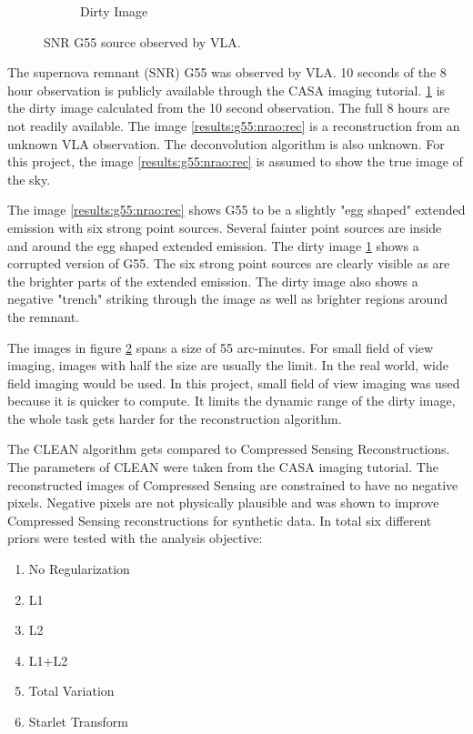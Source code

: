 \begin{figure}[h]
\begin{subfigure}[b]{0.45\linewidth}
		\caption{Dirty Image}
		\label{results:g55:nrao:dirty}
	\end{subfigure}
	\caption{SNR G55 source observed by VLA.}
	\label{results:g55:nrao}
\end{figure}

The supernova remnant (SNR) G55 was observed by VLA. 10 seconds of the 8 hour observation is publicly available through the CASA imaging tutorial\cite{casaImagingGuide}. \ref{results:g55:nrao:dirty} is the dirty image calculated from the 10 second observation. The full 8 hours are not readily available. The image \ref{results:g55:nrao:rec} is a reconstruction from an unknown VLA observation. The deconvolution algorithm is also unknown. For this project, the image \ref{results:g55:nrao:rec} is assumed to show the true image of the sky.

The image \ref{results:g55:nrao:rec} shows G55 to be a slightly "egg shaped" extended emission with six strong point sources. Several fainter point sources are inside and around the egg shaped extended emission. The dirty image \ref{results:g55:nrao:dirty} shows a corrupted version of G55. The six strong point sources are clearly visible as are the brighter parts of the extended emission. The dirty image also shows a negative "trench" striking through the image as well as brighter regions around the remnant. 

The images in figure \ref{results:g55:nrao} spans a size of 55 arc-minutes. For small field of view imaging, images with half the size are usually the limit. In the real world, wide field imaging would be used. In this project, small field of view imaging was used because it is quicker to compute. It limits the dynamic range of the dirty image, the whole task gets harder for the reconstruction algorithm.

The CLEAN algorithm gets compared to Compressed Sensing Reconstructions. The parameters of CLEAN were taken from the CASA imaging tutorial\cite{casaImagingGuide}. The reconstructed images of Compressed Sensing are constrained to have no negative pixels. Negative pixels are not physically plausible and was shown to improve Compressed Sensing reconstructions for synthetic data\cite{mcewen2011compressed}. In total six different priors were tested with the analysis objective:
\begin{enumerate}
	\item No Regularization
	\item L1
	\item L2
	\item L1+L2
	\item Total Variation
	\item Starlet Transform
\end{enumerate}

